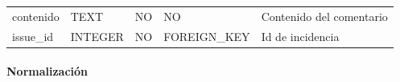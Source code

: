 \documentclass[12pt,a4paperpaper,]{report}
\let\oldparagraph\paragraph
\renewcommand{\paragraph}[1]{\oldparagraph{#1}\mbox{}}
\begin{document}
\begin{longtable}[]{@{}lllll@{}}
\begin{minipage}[t]{0.21\columnwidth}\raggedright\strut
contenido\strut
\end{minipage} & \begin{minipage}[t]{0.19\columnwidth}\raggedright\strut
TEXT\strut
\end{minipage} & \begin{minipage}[t]{0.16\columnwidth}\raggedright\strut
NO\strut
\end{minipage} & \begin{minipage}[t]{0.19\columnwidth}\raggedright\strut
NO\strut
\end{minipage} & \begin{minipage}[t]{0.11\columnwidth}\raggedright\strut
Contenido del comentario\strut
\end{minipage}\tabularnewline
\begin{minipage}[t]{0.21\columnwidth}\raggedright\strut
issue\_id\strut
\end{minipage} & \begin{minipage}[t]{0.19\columnwidth}\raggedright\strut
INTEGER\strut
\end{minipage} & \begin{minipage}[t]{0.16\columnwidth}\raggedright\strut
NO\strut
\end{minipage} & \begin{minipage}[t]{0.19\columnwidth}\raggedright\strut
FOREIGN\_KEY\strut
\end{minipage} & \begin{minipage}[t]{0.11\columnwidth}\raggedright\strut
Id de incidencia\strut
\end{minipage}\tabularnewline
\bottomrule
\end{longtable}

\paragraph{Normalización}\label{normalizaciuxf3n-14}
\end{document}
